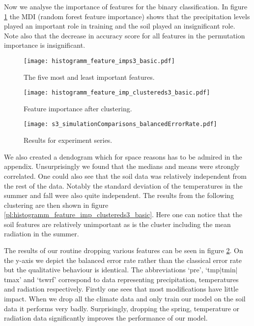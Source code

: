 Now we analyse the importance of features for the binary classification.
In figure \ref{pl:histogramm_feature_imps3_basic} 
the MDI (random forest feature importance) shows that
the precipitation levels played an important role in training and the soil played an insignificant role.
Note also that the decrease in accuracy score for all features in the permutation importance is insignificant.
\begin{figure}[h]
  \centering
  \texttt{[image: histogramm\_feature\_imps3\_basic.pdf]}
  \caption{The five most and least important features.}
  \label{pl:histogramm_feature_imps3_basic}
\end{figure}
\begin{figure}[h]
  \centering
  \begin{minipage}{0.45\textwidth}
    \centering
    \texttt{[image: histogramm\_feature\_imp\_clustereds3\_basic.pdf]}
    \caption{Feature importance after clustering.}
    \label{pl:histogramm_feature_imp_clustereds3_basic}
  \end{minipage}
  \hfill
  \begin{minipage}{0.45\textwidth}
    \centering
    \texttt{[image: s3\_simulationComparisons\_balancedErrorRate.pdf]}
    \caption{Results for experiment series.}
    \label{pl:s3_simulationComparisons_balancedErrorRate}
  \end{minipage}
\end{figure}

We also created a dendogram which for space reasons has to be admired in the appendix.
Unsurprisingly we found that the medians and means were strongly correlated. One could also see that the 
soil data was relatively independent from the rest of the data.
Notably the standard deviation of the temperatures in the summer and fall were also quite independent.
The results from the following clustering are then shown in figure \ref{pl:histogramm_feature_imp_clustereds3_basic}.
Here one can notice that the soil features are relatively unimportant as is the cluster including the mean radiation in the summer.

The results of our routine dropping various features can
be seen in figure \ref{pl:s3_simulationComparisons_balancedErrorRate}.
On the y-axis we depict the balanced error rate rather than the classical error rate but the qualitative behaviour is identical.
The abbreviations `pre', `tmp$|$tmin$|$tmax' and `tswrf' correspond to data representing
precipitation, temperatures and radiation respectively.
Firstly one sees that most modifications have little impact.
When we drop all the climate data and only train our model on the soil data it performs very badly.
Surprisingly, dropping the spring, temperature or radiation data
significantly improves the performance of our model.


